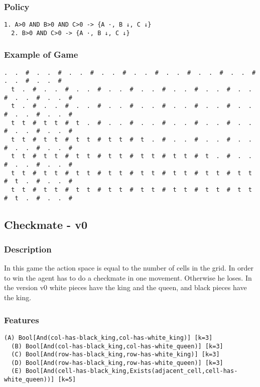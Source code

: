 \documentclass[a4paper]{article}
\begin{document}
\subsubsection{Policy}
\begin{Verbatim}[fontsize=\footnotesize]
  1. A>0 AND B>0 AND C>0 -> {A ·, B ↓, C ↓}
  2. B>0 AND C>0 -> {A ·, B ↓, C ↓}

\end{Verbatim}

\subsubsection{Example of Game}
\begin{Verbatim}[fontsize=\footnotesize]
  .  .  #  .  .  #  .  .  #  .  .  #  .  .  #  .  .  #  .  .  #  .  .  #  .  .  #  .  .  #
  t  .  #  .  .  #  .  .  #  .  .  #  .  .  #  .  .  #  .  .  #  .  .  #  .  .  #  .  .  #
  t  .  #  .  .  #  .  .  #  .  .  #  .  .  #  .  .  #  .  .  #  .  .  #  .  .  #  .  .  #
  t  t  #  t  t  #  t  .  #  .  .  #  .  .  #  .  .  #  .  .  #  .  .  #  .  .  #  .  .  #
  t  t  #  t  t  #  t  t  #  t  t  #  t  .  #  .  .  #  .  .  #  .  .  #  .  .  #  .  .  #
  t  t  #  t  t  #  t  t  #  t  t  #  t  t  #  t  t  #  t  .  #  .  .  #  .  .  #  .  .  #
  t  t  #  t  t  #  t  t  #  t  t  #  t  t  #  t  t  #  t  t  #  t  t  #  t  .  #  .  .  #
  t  t  #  t  t  #  t  t  #  t  t  #  t  t  #  t  t  #  t  t  #  t  t  #  t  .  #  .  .  #
\end{Verbatim}

\subsection{Checkmate - v0}
\subsubsection{Description}
In this game the action space is equal to the number of cells in the grid. In order to win the agent has to do a checkmate in one movement. Otherwise he loses. In the version v0 white pieces have the king and the queen, and black pieces have the king.

\subsubsection{Features}
\begin{Verbatim}[fontsize=\footnotesize]
  (A) Bool[And(col-has-black_king,col-has-white_king)] [k=3]
  (B) Bool[And(col-has-black_king,col-has-white_queen)] [k=3]
  (C) Bool[And(row-has-black_king,row-has-white_king)] [k=3]
  (D) Bool[And(row-has-black_king,row-has-white_queen)] [k=3]
  (E) Bool[And(cell-has-black_king,Exists(adjacent_cell,cell-has-white_queen))] [k=5]

\end{Verbatim}
\end{document}
